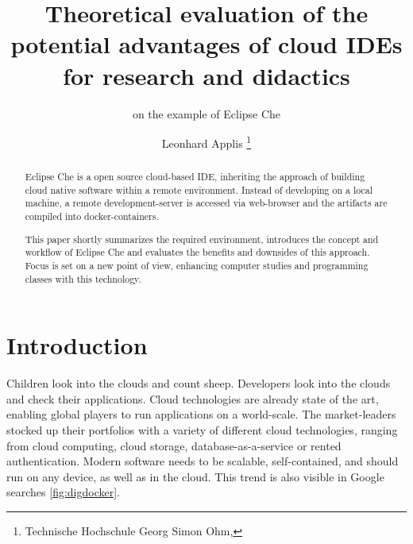 \documentclass[english,utf8]{lni}
\begin{document}
\title[theoretical evaluation of the potential advantages of cloud IDEs for research and didactics]{Theoretical evaluation of the potential advantages of cloud IDEs for research and didactics}
\subtitle{on the example of Eclipse Che} %
\author[Leonhard Applis]
{Leonhard Applis \footnote{Technische Hochschule Georg Simon Ohm, }}
\maketitle

\begin{abstract}
Eclipse Che is a open source cloud-based IDE, inheriting the approach of building cloud native software within a 
remote environment. 
Instead of developing on a local machine, a remote development-server is accessed via web-browser 
and the artifacts are compiled into docker-containers. 

This paper shortly summarizes the required environment, introduces the concept and workflow of Eclipse Che and evaluates 
the benefits and downsides of this approach. 
Focus is set on a new point of view, enhancing computer studies and 
programming classes with this technology. 
\end{abstract}


\section{Introduction}
\label{sec:Introduction}
Children look into the clouds and count sheep. 
Developers look into the clouds and check their applications.  
Cloud technologies are already state of the art, enabling global players to run applications on a world-scale.
The market-leaders stocked up their portfolios with  a  variety  of  different  cloud  technologies,  ranging from cloud computing, cloud storage, database-as-a-service or rented authentication. 
Modern software needs to be scalable, self-contained, and should run on any device, as well as in the cloud.  
This trend is also visible in Google searches \ref{fig:digdocker}. 
\end{document}

